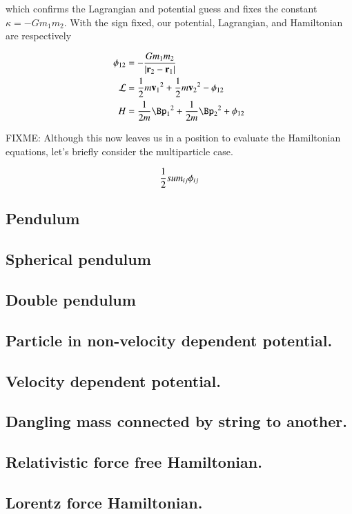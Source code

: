which confirms the Lagrangian and potential guess and fixes the constant $\kappa = - G m_1 m_2$.  With the sign fixed, our potential, Lagrangian, and Hamiltonian are respectively

\begin{align}\label{eqn:hamiltonian:moo5}
\phi_{12} &= -\frac{G m_1 m_2 }{\Abs{\Br_2 - \Br_1}}  \\
\LL &= \inv{2} m {\Bv_1}^2 +\inv{2} m {\Bv_2}^2 - \phi_{12} \\
H &= \inv{2 m} {\Bp_1}^2 +\inv{2 m} {\Bp_2}^2 + \phi_{12}
\end{align}

FIXME:
Although this now leaves us in a position to evaluate the Hamiltonian equations, let's briefly consider the multiparticle case.

\begin{align*}
 \frac{1}{2} sum_{ij} \phi_{ij}
\end{align*}

\subsection{Pendulum}

\subsection{Spherical pendulum}

\subsection{Double pendulum}

\subsection{Particle in non-velocity dependent potential.}

\subsection{Velocity dependent potential.}

\subsection{Dangling mass connected by string to another.}

\subsection{Relativistic force free Hamiltonian.}

\subsection{Lorentz force Hamiltonian.}

\EndArticle
